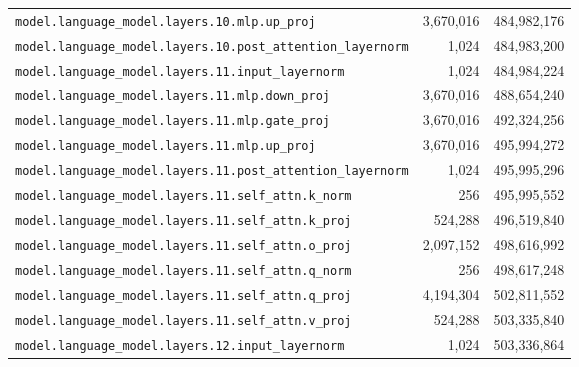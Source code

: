 \documentclass[10pt,a4paper]{article}
\theoremstyle{definition}
\begin{document}
\begin{appendices}
\begin{longtable}{p{9.5cm}rr}
\texttt{model.\allowbreak{}language\_model.\allowbreak{}layers.\allowbreak{}10.\allowbreak{}mlp.\allowbreak{}up\_proj} & 3,670,016 & 484,982,176 \\
\texttt{model.\allowbreak{}language\_model.\allowbreak{}layers.\allowbreak{}10.\allowbreak{}post\_attention\_layernorm} & 1,024 & 484,983,200 \\
\texttt{model.\allowbreak{}language\_model.\allowbreak{}layers.\allowbreak{}11.\allowbreak{}input\_layernorm} & 1,024 & 484,984,224 \\
\texttt{model.\allowbreak{}language\_model.\allowbreak{}layers.\allowbreak{}11.\allowbreak{}mlp.\allowbreak{}down\_proj} & 3,670,016 & 488,654,240 \\
\texttt{model.\allowbreak{}language\_model.\allowbreak{}layers.\allowbreak{}11.\allowbreak{}mlp.\allowbreak{}gate\_proj} & 3,670,016 & 492,324,256 \\
\texttt{model.\allowbreak{}language\_model.\allowbreak{}layers.\allowbreak{}11.\allowbreak{}mlp.\allowbreak{}up\_proj} & 3,670,016 & 495,994,272 \\
\texttt{model.\allowbreak{}language\_model.\allowbreak{}layers.\allowbreak{}11.\allowbreak{}post\_attention\_layernorm} & 1,024 & 495,995,296 \\
\texttt{model.\allowbreak{}language\_model.\allowbreak{}layers.\allowbreak{}11.\allowbreak{}self\_attn.\allowbreak{}k\_norm} & 256 & 495,995,552 \\
\texttt{model.\allowbreak{}language\_model.\allowbreak{}layers.\allowbreak{}11.\allowbreak{}self\_attn.\allowbreak{}k\_proj} & 524,288 & 496,519,840 \\
\texttt{model.\allowbreak{}language\_model.\allowbreak{}layers.\allowbreak{}11.\allowbreak{}self\_attn.\allowbreak{}o\_proj} & 2,097,152 & 498,616,992 \\
\texttt{model.\allowbreak{}language\_model.\allowbreak{}layers.\allowbreak{}11.\allowbreak{}self\_attn.\allowbreak{}q\_norm} & 256 & 498,617,248 \\
\texttt{model.\allowbreak{}language\_model.\allowbreak{}layers.\allowbreak{}11.\allowbreak{}self\_attn.\allowbreak{}q\_proj} & 4,194,304 & 502,811,552 \\
\texttt{model.\allowbreak{}language\_model.\allowbreak{}layers.\allowbreak{}11.\allowbreak{}self\_attn.\allowbreak{}v\_proj} & 524,288 & 503,335,840 \\
\texttt{model.\allowbreak{}language\_model.\allowbreak{}layers.\allowbreak{}12.\allowbreak{}input\_layernorm} & 1,024 & 503,336,864 \\

\end{longtable}
\end{appendices}
\end{document}
